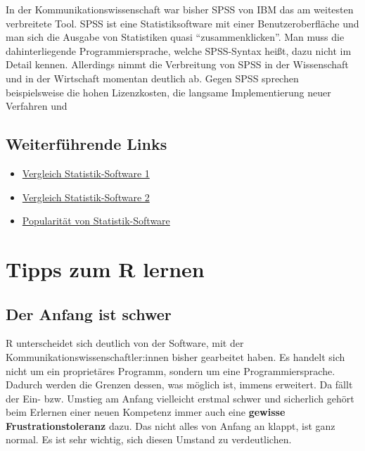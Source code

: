 \documentclass[
]{book}
\providecommand{\tightlist}{%
  \setlength{\itemsep}{0pt}\setlength{\parskip}{0pt}}
\begin{document}
In der Kommunikationswissenschaft war bisher SPSS von IBM das am weitesten verbreitete Tool.
SPSS ist eine Statistiksoftware mit einer Benutzeroberfläche und man sich die Ausgabe von Statistiken quasi ``zusammenklicken''.
Man muss die dahinterliegende Programmiersprache, welche SPSS-Syntax heißt, dazu nicht im Detail kennen.
Allerdings nimmt die Verbreitung von SPSS in der Wissenschaft und in der Wirtschaft momentan
deutlich ab.
Gegen SPSS sprechen beispielsweise die hohen Lizenzkosten, die langsame Implementierung neuer Verfahren und

\hypertarget{weiterfuxfchrende-links-1}{%
\subsection*{Weiterführende Links}\label{weiterfuxfchrende-links-1}}

\begin{itemize}
\tightlist
\item
  \href{https://www.inwt-statistics.de/blog-artikel-lesen/Statistik-Software-R_Python_SAS_SPSS_STATA_im_Vergleich.html}{Vergleich Statistik-Software 1}
\item
  \href{https://novustat.com/statistik-blog/statistikprogramm-ueberblick.html}{Vergleich Statistik-Software 2}
\item
  \href{http://r4stats.com/articles/popularity/}{Popularität von Statistik-Software}
\end{itemize}

\hypertarget{tipps-zum-r-lernen}{%
\section{Tipps zum R lernen}\label{tipps-zum-r-lernen}}

\hypertarget{der-anfang-ist-schwer}{%
\subsection{Der Anfang ist schwer}\label{der-anfang-ist-schwer}}

R unterscheidet sich deutlich von der Software, mit der Kommunikationswissenschaftler:innen bisher gearbeitet haben. Es handelt sich nicht um ein proprietäres Programm, sondern um eine Programmiersprache. Dadurch werden die Grenzen dessen, was möglich ist, immens erweitert. Da fällt der Ein- bzw. Umstieg am Anfang vielleicht erstmal schwer und sicherlich gehört beim Erlernen einer neuen Kompetenz immer auch eine \textbf{gewisse Frustrationstoleranz} dazu. Das nicht alles von Anfang an klappt, ist ganz normal. Es ist sehr wichtig, sich diesen Umstand zu verdeutlichen.
\end{document}

